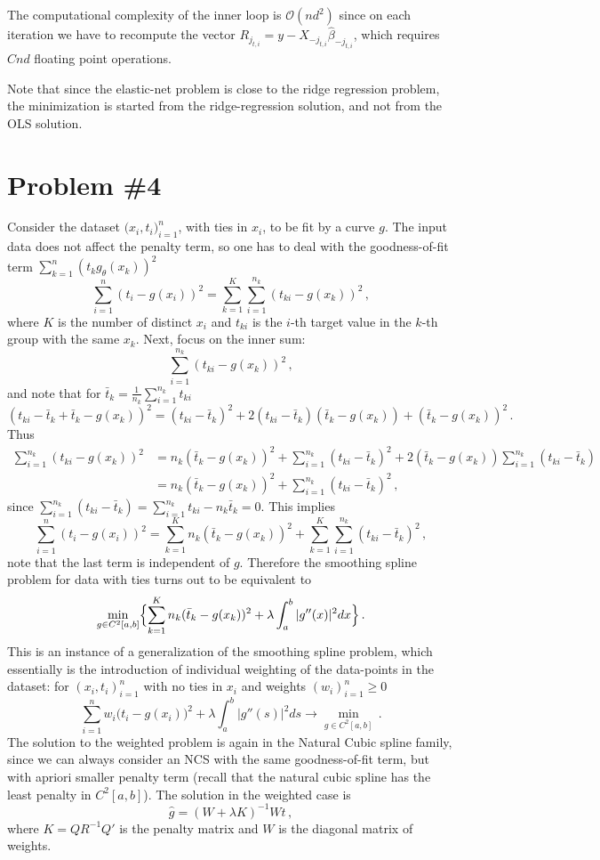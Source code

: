 \documentclass[a4paper,12pt]{extarticle}
\begin{document}
The computational complexity of the inner loop is $\mathcal{O}(n d^2)$ since on each
iteration we have to recompute the vector $R_{j_{t,i}} = y - X_{-j_{t,i}} \hat{\beta}_{-j_{t,i}}$,
which requires $C n d$ floating point operations.

Note that since the elastic-net problem is close to the ridge regression problem,
the minimization is started from the ridge-regression solution, and not from the OLS
solution.


\section{Problem \#4} %
\label{sec:problem_4}

Consider the dataset $\bigl(x_i, t_i\bigr)_{i=1}^n$, with ties in $x_i$, to be 
fit by a curve $g$. The input data does not affect the penalty term, so one has
to deal with the goodness-of-fit term $\sum_{k=1}^n (t_k g_\theta(x_k))^2$
$$ \sum_{i=1}^n (t_i - g(x_i) )^2
  = \sum_{k=1}^K \sum_{i=1}^{n_k} (t_{ki} - g(x_k) )^2
  \,, $$
where $K$ is the number of distinct $x_i$ and $t_{ki}$ is the $i$-th target value
in the $k$-th group with the same $x_k$. Next, focus on the inner sum:
$$ \sum_{i=1}^{n_k} (t_{ki} - g(x_k) )^2  \,, $$
and note that for $\bar{t}_k = \frac{1}{n_k}\sum_{i=1}^{n_k} t_{ki}$
$$ (t_{ki} - \bar{t}_k + \bar{t}_k - g(x_k) )^2
  = (t_{ki} - \bar{t}_k)^2
  + 2 (t_{ki} - \bar{t}_k)(\bar{t}_k - g(x_k) )
  + (\bar{t}_k - g(x_k) )^2
  \,. $$
Thus
\begin{align*}
  \sum_{i=1}^{n_k} (t_{ki} - g(x_k) )^2
    &= n_k (\bar{t}_k - g(x_k) )^2
     + \sum_{i=1}^{n_k} (t_{ki} - \bar{t}_k)^2
     + 2 (\bar{t}_k - g(x_k) ) \sum_{i=1}^{n_k} (t_{ki} - \bar{t}_k) \\
    &= n_k (\bar{t}_k - g(x_k) )^2 + \sum_{i=1}^{n_k} (t_{ki} - \bar{t}_k)^2 \,,
\end{align*}
since $\sum_{i=1}^{n_k} (t_{ki} - \bar{t}_k) = \sum_{i=1}^{n_k} t_{ki} - n_k \bar{t}_k = 0$.
This implies
$$ \sum_{i=1}^n (t_i - g(x_i) )^2
  = \sum_{k=1}^K n_k (\bar{t}_k - g(x_k) )^2
  + \sum_{k=1}^K \sum_{i=1}^{n_k} (t_{ki} - \bar{t}_k)^2
  \,, $$
note that the last term is independent of $g$. Therefore the smoothing spline problem
for data with ties turns out to be equivalent to
$$ \min_{g\in C^2[a,b]} \Bigl\{
    \sum_{k=1}^K n_k (\bar{t}_k - g(x_k) )^2
      + \lambda \int_a^b |g''(x)|^2 dx
  \Bigr\}
  \,. $$
This is an instance of a generalization of the smoothing spline problem, which
essentially is the introduction of individual weighting of the data-points in the
dataset: for $(x_i, t_i)_{i=1}^n$ with no ties in $x_i$ and weights $(w_i)_{i=1}^n\geq 0$
$$ \sum_{i=1}^n w_i \bigl(t_i - g(x_i)\bigr)^2
    + \lambda \int_a^b |g''(s)|^2 ds \to \min_{g\in C^2[a,b]}
  \,. $$
The solution to the weighted problem is again in the Natural Cubic spline family,
since we can always consider an NCS with the same goodness-of-fit term, but
with apriori smaller penalty term (recall that the natural cubic spline has the least
penalty in $C^2[a,b]$). The solution in the weighted case is
$$ \hat{g} = ( W + \lambda K )^{-1} W t \,, $$
where $K = QR^{-1} Q'$ is the penalty matrix and $W$ is the diagonal matrix of
weights.

\end{document}

